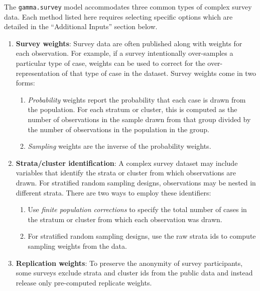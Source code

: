 The {\tt gamma.survey} model accommodates three common types of 
complex survey data.  Each method listed here requires selecting 
specific options which are detailed in the ``Additional Inputs'' 
section below.  \begin{enumerate}

\item \textbf{Survey weights}:  Survey data are often published along
with weights for each observation.  For example, if a survey
intentionally over-samples a particular type of case, weights can be
used to correct for the over-representation of that type of case in
the dataset. Survey weights come in two forms:
\begin{enumerate}

\item \textit{Probability} weights report the probability that each
case is drawn from the population.  For each stratum or cluster, 
this is computed as the number of observations in the sample drawn 
from that group divided by the number of observations in the 
population in the group.

\item \textit{Sampling} weights are the inverse of the probability
weights.   

\end{enumerate}

\item \textbf{Strata/cluster identification}:  A complex survey 
dataset may include variables that identify the strata or cluster 
from which observations are drawn.  For stratified random sampling 
designs, observations may be nested in different strata.  There are 
two ways to employ these identifiers:

\begin{enumerate}

\item Use \textit{finite population corrections} to specify the
total number of cases in the stratum or cluster from which each
observation was drawn.

\item For stratified random sampling designs, use the raw strata ids
to compute sampling weights from the data.

\end{enumerate}

\item \textbf{Replication weights}: To preserve the anonymity of
survey participants, some surveys exclude strata and cluster ids 
from the public data and instead release only pre-computed replicate 
weights.

\end{enumerate}

